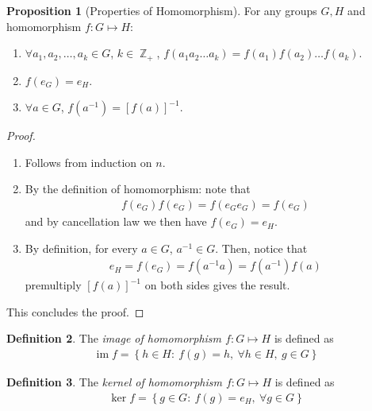 \documentclass[11pt]{amsart} %
\theoremstyle{definition}
\newtheorem{definition}{Definition}[section]
\newtheorem{proposition}[definition]{Proposition}
\theoremstyle{definition}
\DeclareMathOperator{\Z}{\mathbb{Z}}
\DeclareMathOperator{\im}{im}
\numberwithin{equation}{section}
\newcommand{\condset}[4]{\left\{ #1  : \: #2 #3 #4 \right\}}
\begin{document}
\begin{proposition}[Properties of Homomorphism]
	\label{proppropertiesofhomomorphism}
	For any groups $G,H$ and homomorphism $f:G\mapsto H$:
	\begin{enumerate}[noitemsep]
		\item $\forall a_1,a_2,\dots, a_k \in G$, $k \in \Z_+$, $f(a_1 a_2 \dots a_k) = f(a_1) f(a_2) \dots f(a_k)$. 
		\item $f(e_G) = e_H$.
		\item $\forall a \in G$, $f(a^{-1}) = [f(a)]^{-1}$.
	\end{enumerate}
\end{proposition}

\begin{proof}
	\begin{enumerate}
		\item Follows from induction on $n$.
		
		\item By the definition of homomorphism: note that
		\begin{align*}
			f(e_G) f(e_G) = f(e_G e_G) = f(e_G)
		\end{align*}
		and by cancellation law we then have $f(e_G) =e_H$.
		
		
		\item By definition, for every $a \in G$, $a^{-1} \in G$. Then, notice that
		\begin{align*}
		e_H = f(e_G) = f(a^{-1} a) = f(a^{-1}) f(a)
		\end{align*}
		premultiply $[f(a)]^{-1}$ on both sides gives the result.
	\end{enumerate}
	This concludes the proof.
\end{proof}

\begin{definition}
	The \textit{image of homomorphism $f: G \mapsto H$} is defined as
	\begin{align}
	\label{defimagehomomorphism}
	\im f = \condset{h \in H}{ f(g) = h}{, \: \forall h \in H}{, \: g \in G }
	\end{align}
\end{definition}

\begin{definition}
	The \textit{kernel of homomorphism $f: G \mapsto H$} is defined as
	\begin{align}
	\label{defkernelf}
	\ker f = \condset{g \in G}{ f(g) = e_H}{, \: \forall }{ g \in G }
	\end{align}
\end{definition}
\end{document}

